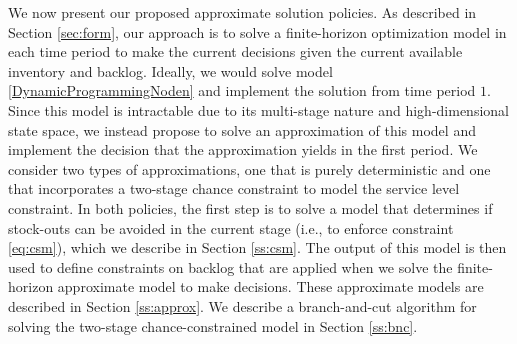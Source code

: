 \documentclass[msom]{oo}
\begin{document}
We now present our proposed approximate solution policies. 
As described in Section \ref{sec:form}, our approach is to solve a finite-horizon optimization model in each time period to make the current decisions given the current available inventory and backlog. 
Ideally, we would solve model \eqref{DynamicProgrammingNoden} and implement the solution from time period $1$.
Since this model is intractable due to its multi-stage nature and high-dimensional state space,
we instead propose to solve an approximation of this model and implement the decision that the approximation yields in the first period. We consider two types of approximations, one that is purely deterministic and one that incorporates a two-stage chance constraint to model the service level constraint. In both policies, the first step is to solve a model that determines if stock-outs can be avoided in the current stage (i.e., to enforce constraint \eqref{eq:csm}), which we describe in Section \ref{ss:csm}. The output of this model is then used to define constraints on backlog that are applied when we solve the finite-horizon approximate model to make decisions. These approximate models are described in Section \ref{ss:approx}. We describe a branch-and-cut algorithm for solving the two-stage chance-constrained model in Section \ref{ss:bnc}.

\end{document}
